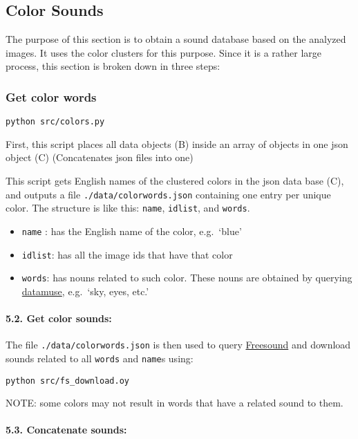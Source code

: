 \subsection{Color Sounds}

The purpose of this section is to obtain a sound database based on the analyzed images. It uses the color clusters for this purpose. Since it is a rather large process, this section is broken down in three steps:


\subsubsection{Get color words}

\texttt{python\ src/colors.py}

First, this script places all data objects (B) inside an array of objects in one \gls{json} object (C) (Concatenates \gls{json} files into one)

This script gets English names of the clustered colors in the \gls{json} data base (C), and outputs a file \texttt{./data/colorwords.json} containing one entry per unique color. The structure is like this: \texttt{name}, \texttt{idlist}, and \texttt{words}.

\begin{itemize}
\tightlist
\item
  \texttt{name} : has the English name of the color, e.g.~`blue'
\item
  \texttt{idlist}: has all the image ids that have that color
\item
  \texttt{words}: has nouns related to such color. These nouns are obtained by querying \href{https://datamuse.com}{datamuse}, e.g.~`sky, eyes, etc.'
\end{itemize}


\paragraph{5.2. Get color sounds:}

The file \texttt{./data/colorwords.json} is then used to query \href{https://freesound.org}{Freesound} and download sounds related to all \texttt{words} and \texttt{name}s using:

\texttt{python\ src/fs\_download.oy}

NOTE: some colors may not result in words that have a related sound to them.


\paragraph{5.3. Concatenate sounds:}

